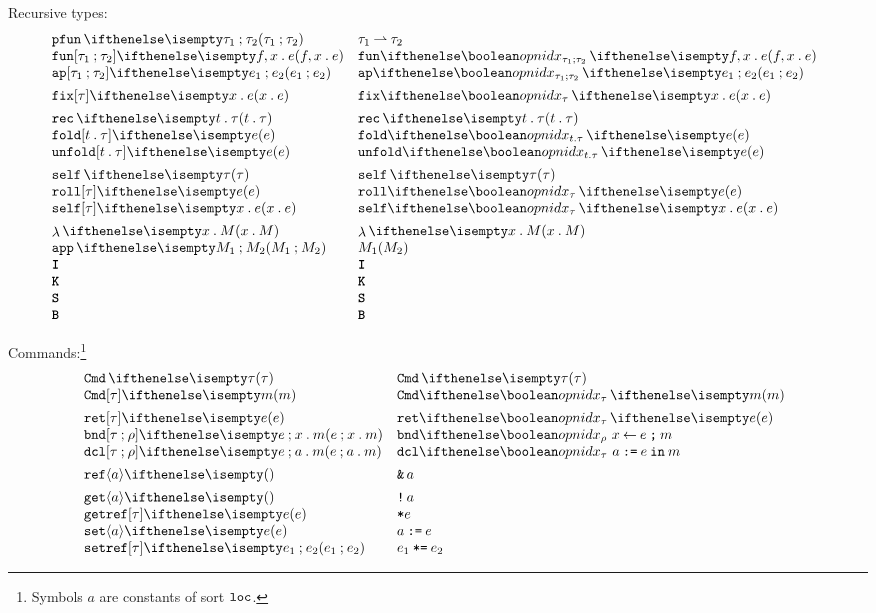 \documentclass[11pt,twoside]{article}
\begin{document}
\noindent Recursive types:
\begin{displaymath}
  \begin{array}{l@{\quad}l@{\quad}l}

    \parrTy{\tau_1}{\tau_2} & \parrTy*{\tau_1}{\tau_2} \\
    \funEx{f}{x}{e} & \funEx*{f}{x}{e} \\
    \appEx{e_1}{e_2} & \appEx*{e_1}{e_2} \\[1ex]

    \fixEx[\tau]{x}{e} & \fixEx*[\tau]{x}{e}  \\[1ex]

    \recTy{t}{\tau} & \recTy*{t}{\tau} \\
    \foldEx[t][\tau]{e}  & \foldEx*{e} \\
    \unfoldEx[t][\tau]{e} & \unfoldEx*{e} \\[1ex]

    \selfTy{\tau}  & \selfTy*{\tau} \\
    \rollEx[\tau]{e} & \rollEx*{e} \\
    \selfEx[\tau]{x}{e} & \selfEx*{x}{e} \\[1ex]

    \ulamEx{x}{M} & \ulamEx*{x}{M} \\
    \uapEx{M_1}{M_2} & \uapEx*{M_1}{M_2} \\
    \uIEx & \uIEx* \\
    \uKEx & \uKEx* \\
    \uSEx & \uSEx* \\
    \uBEx & \uBEx*
  \end{array}
\end{displaymath}

\noindent Commands:\footnote{Symbols $a$ are constants of sort $\texttt{loc}$.}
\begin{displaymath}
  \begin{array}{l@{\quad}l@{\quad}l}
    \cmdTy{\tau}  & \cmdTy*{\tau} \\
    \cmdEx[\tau]{m} & \cmdEx*{m} \\[1ex]
    \retCmd[\tau]{e} & \retCmd*{e} \\
    \bndCmd{e}{x}{m} & \bndCmd*{e}{x}{m} \\
    \dclCmd{e}{a}{m} & \dclCmd*{e}{a}{m} \\[1ex]
    \refEx{a} & \refEx*{a} \\[1ex]
    \getCmd{a} & \getCmd*{a} \\
    \getrefCmd[\tau]{e} & \getrefCmd*{e} \\
    \setCmd{a}{e} & \setCmd*{a}{e} \\
    \setrefCmd[\tau]{e_1}{e_2} & \setrefCmd*[\tau]{e_1}{e_2}
 \end{array}
\end{displaymath}
\end{document}
